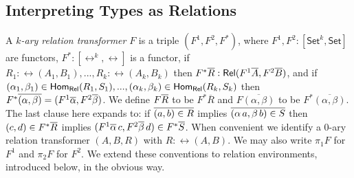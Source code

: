 \documentclass[runningheads]{llncs}
\newcommand{\set}{\mathsf{Set}}
\begin{document}
\begin{definition}
\begin{itemize}
\end{itemize}
\end{definition}

\vspace*{-0.2in}

\subsection{Interpreting Types as Relations}\label{sec:rel-interp}

A {\em $k$-ary relation transformer} $F$ is a triple $(F^1, F^2,F^*)$,
where $F^1,F^2 : [\set^k,\set]$ are functors, $F^* : [\rel^k, \rel]$
is a functor, if $R_1:\rel(A_1,B_1),...,R_k:\rel(A_k,B_k)$ then $F^*
\overline{R} : \mathsf{Rel}(F^1 \overline{A}, F^2 \overline{B})$, and if $(\alpha_1, \beta_1)
\in \mathsf{Hom_{Rel}}(R_1,S_1),..., (\alpha_k, \beta_k) \in \mathsf{Hom_{Rel}}(R_k,S_k)$
then $F^* \overline{(\alpha, \beta)} = (F^1 \overline{\alpha}, F^2 \overline{\beta})$.
We define $F\overline{R}$ to be $F^*\overline{R}$ and
$F\overline{(\alpha,\beta)}$ to be $F^*\overline{(\alpha,\beta)}$.
The last clause here
expands to: if
$\overline{(a,b) \in R}$ implies $\overline{(\alpha\,a,\beta\,b) \in S}$ then
$(c,d) \in F^*\overline{R}$ implies $(F^1 \overline{\alpha}\,c,F^2 \overline{\beta}\,d)
\in F^*\overline{S}$. When convenient we identify a $0$-ary relation
transformer $(A,B,R)$ with $R : \rel(A,B)$. We may also write $\pi_1
F$ for $F^1$ and $\pi_2 F$ for $F^2$. We extend these conventions to
relation environments, introduced
below, in the obvious way.
\end{document}
